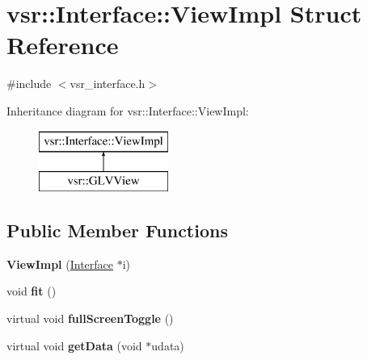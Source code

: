 \hypertarget{structvsr_1_1_interface_1_1_view_impl}{\section{vsr\-:\-:Interface\-:\-:View\-Impl Struct Reference}
\label{structvsr_1_1_interface_1_1_view_impl}
}


{\ttfamily \#include $<$vsr\-\_\-interface.\-h$>$}

Inheritance diagram for vsr\-:\-:Interface\-:\-:View\-Impl\-:\begin{figure}[H]
\begin{center}
\leavevmode
\includegraphics[height=2.000000cm]{structvsr_1_1_interface_1_1_view_impl}
\end{center}
\end{figure}
\subsection*{Public Member Functions}
\begin{DoxyCompactItemize}
\item 
\hypertarget{structvsr_1_1_interface_1_1_view_impl_ab4f94abd89737c23a2805cfcc06fcb13}{{\bfseries View\-Impl} (\hyperlink{classvsr_1_1_interface}{Interface} $\ast$i)}\label{structvsr_1_1_interface_1_1_view_impl_ab4f94abd89737c23a2805cfcc06fcb13}

\item 
\hypertarget{structvsr_1_1_interface_1_1_view_impl_ac0800387b63c3a584e379a2d50ca123b}{void {\bfseries fit} ()}\label{structvsr_1_1_interface_1_1_view_impl_ac0800387b63c3a584e379a2d50ca123b}

\item 
\hypertarget{structvsr_1_1_interface_1_1_view_impl_a8e80630ece5401bcbe285c70bd46fd88}{virtual void {\bfseries full\-Screen\-Toggle} ()}\label{structvsr_1_1_interface_1_1_view_impl_a8e80630ece5401bcbe285c70bd46fd88}

\item 
\hypertarget{structvsr_1_1_interface_1_1_view_impl_aa93d1670ce779cee422d5e5ab487e6d8}{virtual void {\bfseries get\-Data} (void $\ast$udata)}\label{structvsr_1_1_interface_1_1_view_impl_aa93d1670ce779cee422d5e5ab487e6d8}

\end{DoxyCompactItemize}
